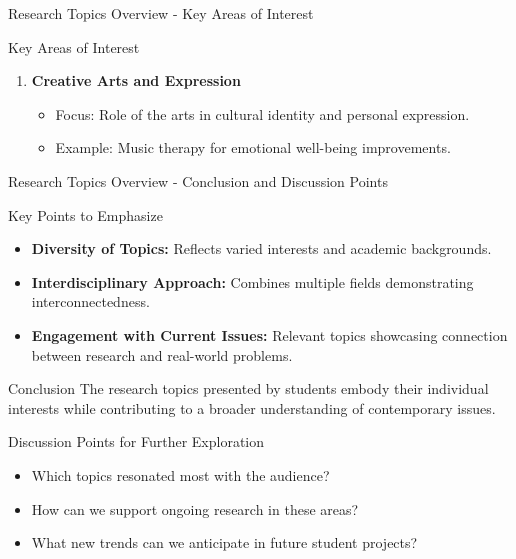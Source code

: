 \documentclass[aspectratio=169]{beamer}
\begin{document}
\begin{frame}[fragile]{Research Topics Overview - Key Areas of Interest}
\begin{block}{Key Areas of Interest}
\begin{enumerate}
\begin{itemize}
                    \item Focus: Equity, diversity, and community service initiatives.
                    \item Example: Effectiveness of community outreach programs in underserved neighborhoods.
                \end{itemize}
            \item \textbf{Creative Arts and Expression}
                \begin{itemize}
                    \item Focus: Role of the arts in cultural identity and personal expression.
                    \item Example: Music therapy for emotional well-being improvements.
                \end{itemize}
        \end{enumerate}
    \end{block}
\end{frame}

\begin{frame}[fragile]{Research Topics Overview - Conclusion and Discussion Points}
    \begin{block}{Key Points to Emphasize}
        \begin{itemize}
            \item \textbf{Diversity of Topics:} Reflects varied interests and academic backgrounds.
            \item \textbf{Interdisciplinary Approach:} Combines multiple fields demonstrating interconnectedness.
            \item \textbf{Engagement with Current Issues:} Relevant topics showcasing connection between research and real-world problems.
        \end{itemize}
    \end{block}

    \begin{block}{Conclusion}
        The research topics presented by students embody their individual interests while 
        contributing to a broader understanding of contemporary issues. 
    \end{block}

    \begin{block}{Discussion Points for Further Exploration}
        \begin{itemize}
            \item Which topics resonated most with the audience?
            \item How can we support ongoing research in these areas?
            \item What new trends can we anticipate in future student projects?
        \end{itemize}
    \end{block}
\end{frame}
\end{document}
